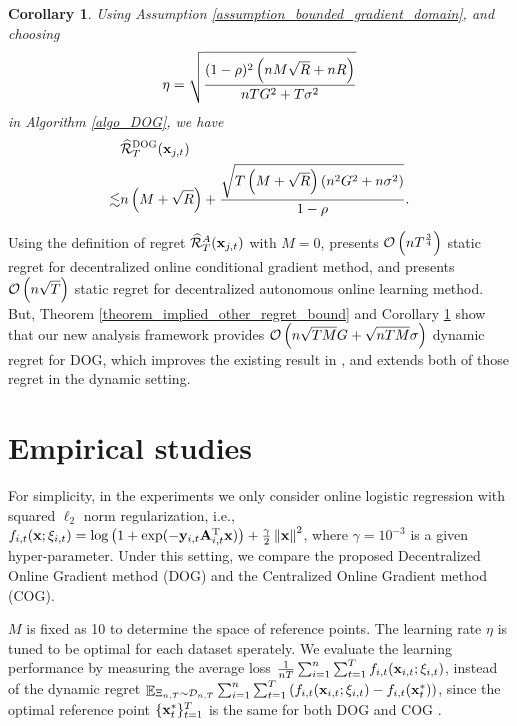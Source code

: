\documentclass{article}
\newtheorem{Corollary}{\bf{Corollary}}
\begin{document}
\begin{Corollary}
\label{corollary_implied_other_regret_bound}
Using Assumption \ref{assumption_bounded_gradient_domain}, and choosing 
\begin{align}
\nonumber
\eta = \sqrt{\frac{(1-\rho)^2 \left( nM\sqrt{R} + nR \right)}{ nTG^2 + T\sigma^2 }}
\end{align} in Algorithm \ref{algo_DOG}, we have
\begin{align}
\nonumber
& \widehat{{\mathcal{R}}}_T^{\textsc{DOG}}({\bf x}_{j,t}) \\ \nonumber
\lesssim & n\left( M+\sqrt{R} \right) + \frac{\sqrt{T\left( M+\sqrt{R} \right)(n^2G^2 + n\sigma^2)}}{1-\rho}.
\end{align}
\end{Corollary} Using the definition of regret $\widehat{{\mathcal{R}}}_T^{A}({\bf x}_{j,t})$ with $M=0$, \citet{pmlr-v70-zhang17g} presents ${\mathcal{O}\left( n T^\frac{3}{4} \right)}$ static regret for decentralized online conditional gradient method, and \citet{tkde-6311406} presents ${\mathcal{O}\left( n\sqrt{T} \right)}$ static regret for decentralized autonomous online learning method. But, Theorem \ref{theorem_implied_other_regret_bound} and Corollary \ref{corollary_implied_other_regret_bound} show that our new analysis framework provides ${\mathcal{O}\left( n\sqrt{TM}G + \sqrt{nTM}\sigma \right)}$ dynamic regret for DOG, which improves the existing result in \citet{pmlr-v70-zhang17g}, and extends both of those regret in the dynamic setting.





\section{Empirical studies}


For simplicity, in the experiments we only consider online logistic regression with squared $\ell_2$ norm regularization, i.e., $f_{i,t}({\bf x};\xi_{i,t}) = \log\left( 1+\exp(-{\bf y}_{i,t}{\bf A}_{i,t}^{\rm T} {\bf x}) \right) + \frac{\gamma}{2}\left\lVert{\bf x}\right\rVert^2$, where $\gamma = 10^{-3}$ is a given hyper-parameter. Under this setting, we compare the proposed Decentralized Online Gradient method (DOG) and the Centralized Online Gradient method (COG). 

$M$ is fixed as 10 to determine the space of reference points. The learning rate $\eta$ is tuned to be optimal for each dataset sperately. We evaluate the learning performance by measuring the average loss $\frac{1}{nT}\sum_{i=1}^n\sum_{t=1}^T f_{i,t}({\bf x}_{i,t};\xi_{i,t})$, instead of the dynamic regret $\mathop{\mathbb{E}}_{\Xi_{n,T}\sim \mathcal{D}_{n,T}}\sum_{i=1}^n\sum_{t=1}^T \left(  f_{i,t}({\bf x}_{i,t};\xi_{i,t}) - f_{i,t}({\bf x}_t^{\ast})  \right)$, since the optimal reference point $\{{\bf x}_t^\ast\}^T_{t=1}$ is the same for both DOG and COG .  
\end{document}
